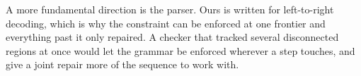 \documentclass{article}
\begin{document}
A more fundamental direction is the parser. Ours is written for left-to-right
decoding, which is why the constraint can be enforced at one frontier and
everything past it only repaired. A checker that tracked several disconnected
regions at once would let the grammar be enforced wherever a step touches, and
give a joint repair more of the sequence to work with.

\clearpage



\clearpage

\end{document}
